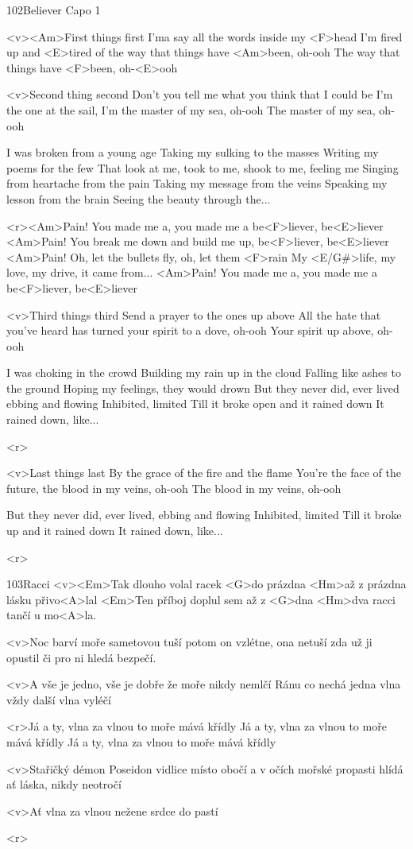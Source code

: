\begin{song}{102}{Believer}{}
Capo 1

<v><Am>First things first
I'ma say all the words inside my <F>head
I'm fired up and <E>tired of the way that things have <Am>been, oh-ooh
The way that things have <F>been, oh-<E>ooh

<v>Second thing second
Don't you tell me what you think that I could be
I'm the one at the sail, I'm the master of my sea, oh-ooh
The master of my sea, oh-ooh

I was broken from a young age
Taking my sulking to the masses
Writing my poems for the few
That look at me, took to me, shook to me, feeling me
Singing from heartache from the pain
Taking my message from the veins
Speaking my lesson from the brain
Seeing the beauty through the...

<r><Am>Pain!
You made me a, you made me a be<F>liever, be<E>liever
<Am>Pain!
You break me down and build me up, be<F>liever, be<E>liever
<Am>Pain!
Oh, let the bullets fly, oh, let them <F>rain
My <E/G#>life, my love, my drive, it came from...
<Am>Pain!
You made me a, you made me a be<F>liever, be<E>liever

<v>Third things third
Send a prayer to the ones up above
All the hate that you've heard has turned your spirit to a dove, oh-ooh
Your spirit up above, oh-ooh

I was choking in the crowd
Building my rain up in the cloud
Falling like ashes to the ground
Hoping my feelings, they would drown
But they never did, ever lived
ebbing and flowing
Inhibited, limited
Till it broke open and it rained down
It rained down, like...

<r>

<v>Last things last
By the grace of the fire and the flame
You're the face of the future,
the blood in my veins, oh-ooh
The blood in my veins, oh-ooh

But they never did, ever lived,
ebbing and flowing
Inhibited, limited
Till it broke up and it rained down
It rained down, like...

<r>
\end{song}
\begin{song}[Cermaque]{103}{Racci}{}
<v><Em>Tak dlouho volal racek <G>do prázdna
<Hm>až z prázdna lásku přivo<A>lal
<Em>Ten příboj doplul sem až z <G>dna
<Hm>dva racci tančí u mo<A>la.

<v>Noc barví moře sametovou tuší
potom on vzlétne, ona netuší
zda už ji opustil
či pro ni hledá bezpečí.

<v>A vše je jedno, vše je dobře
že moře nikdy nemlčí
Ránu co nechá jedna vlna
vždy další vlna vyléčí

<r>Já a ty, vlna za vlnou
to moře mává křídly
Já a ty, vlna za vlnou
to moře mává křídly
Já a ty, vlna za vlnou
to moře mává křídly

<v>Stařičký démon Poseidon
vidlice místo obočí
a v očích mořské propasti
hlídá ať láska, nikdy neotročí

<v>Ať vlna za vlnou
nežene srdce do pastí

<r>
\end{song}
